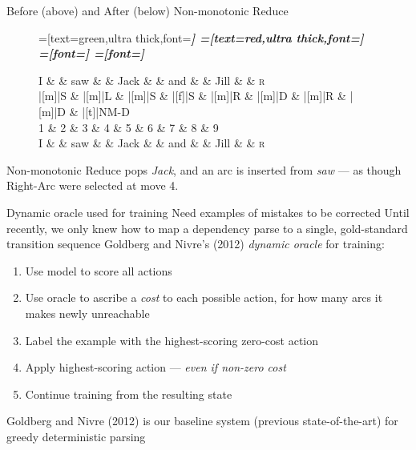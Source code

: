 \documentclass{lecture}
\begin{document}
\begin{plain}{Before (above) and After (below) Non-monotonic Reduce}
\begin{figure}
    \centering
    \begin{dependency}[theme=simple]
    =[text=green,ultra thick,font=\bfseries\itshape]
    =[text=red,ultra thick,font=\bfseries\itshape]
    =[font=\bfseries\itshape]
    =[font=\itshape]
    \begin{deptext}[column sep=.075cm, row sep=.1ex]
        I \&           \& saw \&          \& Jack       \& \& and     \&           \& Jill \&   \& \textsc{r} \\
        |[m]|S \& |[m]|L \& |[m]|S   \& |[f]|S \& |[m]|R \& |[m]|D \& |[m]|R \& |[m]|D \& |[t]|NM-D \\
        1 \&     2       \& 3  \&   4      \& 5          \& 6 \& 7     \& 8 \& 9 \\

        I \&           \& saw \&          \& Jack       \& \& and     \&           \& Jill \& \& \textsc{r} \\
\end{deptext}
    
    
\end{dependency}
\end{figure}
Non-monotonic Reduce pops \emph{Jack}, and an
arc is inserted from \emph{saw} --- as though Right-Arc were selected at move 4.
\end{plain}

\begin{points}{Dynamic oracle used for training}
\p Need examples of mistakes to be corrected
\p Until recently, we only knew how to map a dependency parse to a single,
gold-standard transition sequence
\p Goldberg and Nivre's (2012) \emph{dynamic oracle} for training: \\
\begin{enumerate}
    \item Use model to score all actions
    \item Use oracle to ascribe a \emph{cost} to each possible action, for how many
          arcs it makes newly unreachable
    \item Label the example with the highest-scoring zero-cost action
    \item Apply highest-scoring action --- \emph{even if non-zero cost}
    \item Continue training from the resulting state
\end{enumerate}
\p Goldberg and Nivre (2012) is our baseline system (previous state-of-the-art)
for greedy deterministic parsing
\end{points}
\end{document}
